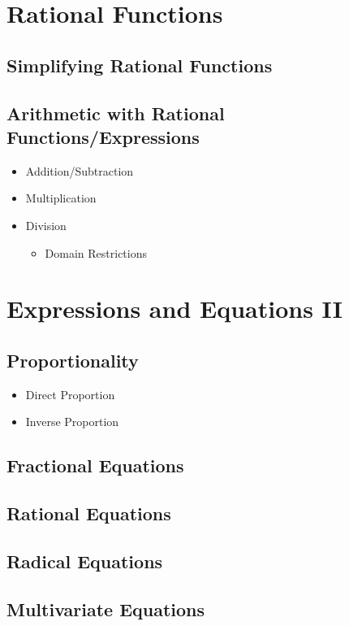 \documentclass[11pt]{article}
\begin{document}
\setcounter{section}{10}
\section{Rational Functions}
\subsection{Simplifying Rational Functions}
\subsection{Arithmetic with Rational Functions/Expressions}
\begin{itemize}
    \item Addition/Subtraction
    \item Multiplication
    \item Division
    \begin{itemize}
        \item Domain Restrictions
    \end{itemize}
\end{itemize}

\setcounter{section}{11}
\section{Expressions and Equations II}
\subsection{Proportionality}
\begin{itemize}
    \item Direct Proportion
    \item Inverse Proportion
\end{itemize}
\subsection{Fractional Equations}
\subsection{Rational Equations}
\subsection{Radical Equations}
\subsection{Multivariate Equations}
\end{document}
